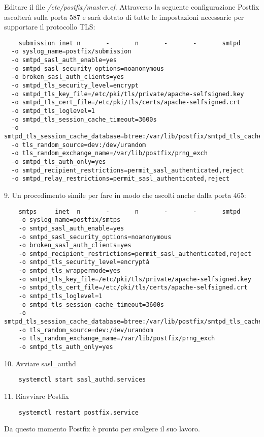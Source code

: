 Editare il file \textit{/etc/postfix/master.cf}. Attraverso la seguente configurazione Postfix ascolterà 
sulla porta 587 e sarà dotato di tutte le impostazioni necessarie per supportare il protocollo TLS:

\begin{verbatim}
    submission inet n       -       n       -       -       smtpd
  -o syslog_name=postfix/submission
  -o smtpd_sasl_auth_enable=yes
  -o smtpd_sasl_security_options=noanonymous
  -o broken_sasl_auth_clients=yes
  -o smtpd_tls_security_level=encrypt
  -o smtpd_tls_key_file=/etc/pki/tls/private/apache-selfsigned.key
  -o smtpd_tls_cert_file=/etc/pki/tls/certs/apache-selfsigned.crt
  -o smtpd_tls_loglevel=1
  -o smtpd_tls_session_cache_timeout=3600s
  -o smtpd_tls_session_cache_database=btree:/var/lib/postfix/smtpd_tls_cache
  -o tls_random_source=dev:/dev/urandom
  -o tls_random_exchange_name=/var/lib/postfix/prng_exch
  -o smtpd_tls_auth_only=yes
  -o smtpd_recipient_restrictions=permit_sasl_authenticated,reject
  -o smtpd_relay_restrictions=permit_sasl_authenticated,reject
\end{verbatim}
9. Un procedimento simile per fare in modo che ascolti anche dalla porta 465:

\begin{verbatim}
    smtps     inet  n       -       n       -       -       smtpd
    -o syslog_name=postfix/smtps
    -o smtpd_sasl_auth_enable=yes
    -o smtpd_sasl_security_options=noanonymous
    -o broken_sasl_auth_clients=yes
    -o smtpd_recipient_restrictions=permit_sasl_authenticated,reject
    -o smtpd_tls_security_level=encryptà
    -o smtpd_tls_wrappermode=yes
    -o smtpd_tls_key_file=/etc/pki/tls/private/apache-selfsigned.key
    -o smtpd_tls_cert_file=/etc/pki/tls/certs/apache-selfsigned.crt
    -o smtpd_tls_loglevel=1
    -o smtpd_tls_session_cache_timeout=3600s
    -o smtpd_tls_session_cache_database=btree:/var/lib/postfix/smtpd_tls_cache
    -o tls_random_source=dev:/dev/urandom
    -o tls_random_exchange_name=/var/lib/postfix/prng_exch
    -o smtpd_tls_auth_only=yes
\end{verbatim}
10. Avviare sasl\_authd
\begin{verbatim}
    systemctl start sasl_authd.services
\end{verbatim}
11. Riavviare Postfix
\begin{verbatim}
    systemctl restart postfix.service
\end{verbatim}

Da questo momento Postfix è pronto per svolgere il suo lavoro.

